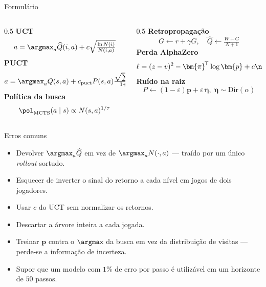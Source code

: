 \documentclass[aspectratio=169, 11pt]{beamer}
\newcommand{\Nv}[1]{N(#1)}                      %
\newcommand{\Qh}{\widehat{Q}}                   %
\newcommand{\ret}{G}                            %
\begin{document}
\begin{frame}{Formulário}
  \begin{columns}[T]
    \begin{column}{0.5\textwidth}
      {\small
      \textbf{UCT}
      \[ a = \argmax_a \Qh(i,a) + c\sqrt{\tfrac{\ln \Nv{i}}{\Nv{i,a}}} \]
      \textbf{PUCT}
      \[ a = \argmax_a Q(s,a) + c_{\text{puct}} P(s,a)\tfrac{\sqrt{\sum_b \Nv{s,b}}}{1+\Nv{s,a}} \]
      \textbf{Política da busca}
      \[ \pol_{\text{MCTS}}(a\mid s) \propto \Nv{s,a}^{1/\tau} \]}
    \end{column}
    \begin{column}{0.5\textwidth}
      {\small
      \textbf{Retropropagação}
      \[ \ret \gets r + \gamma \ret, \quad
         \Qh \gets \tfrac{W + \ret}{N+1} \]
      \textbf{Perda AlphaZero}
      \[ \ell = (z-v)^2 - \bm{\pi}^{\!\top}\log \bm{p} + c\norm{\theta}^2 \]
      \textbf{Ruído na raiz}
      \[ P \gets (1-\varepsilon)\bm{p} + \varepsilon\,\bm{\eta},\;
         \bm{\eta}\sim\mathrm{Dir}(\alpha) \]}
    \end{column}
  \end{columns}
\end{frame}

\begin{frame}{Erros comuns}
  \begin{alertabox}
    \begin{itemize}\setlength{\itemsep}{0.3ex}
      \item Devolver $\argmax_a \Qh$ em vez de $\argmax_a \Nv{\cdot,a}$ --- traído por um único \emph{rollout} sortudo.
      \item Esquecer de inverter o sinal do retorno a cada nível em jogos de dois jogadores.
      \item Usar $c$ do UCT sem normalizar os retornos.
      \item Descartar a árvore inteira a cada jogada.
      \item Treinar $\bm{p}$ contra o $\argmax$ da busca em vez da distribuição de visitas --- perde-se a informação de incerteza.
      \item Supor que um modelo com $1\%$ de erro por passo é utilizável em um horizonte de $50$ passos.
    \end{itemize}
  \end{alertabox}
\end{frame}
\end{document}
